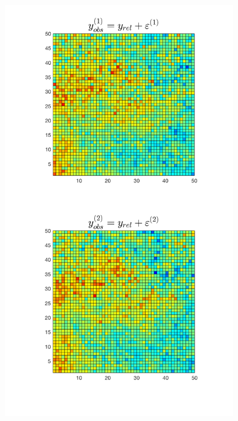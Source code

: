 \documentclass{beamer}
\begin{document}
\begin{frame}
\begin{columns}
\begin{column}{0.5\textwidth}
\begin{center}
     \includegraphics[width=0.75\textwidth]{Images/yobservation.png} 
     \end{center}
\end{column}
\end{columns}

\end{frame}
\end{document}
